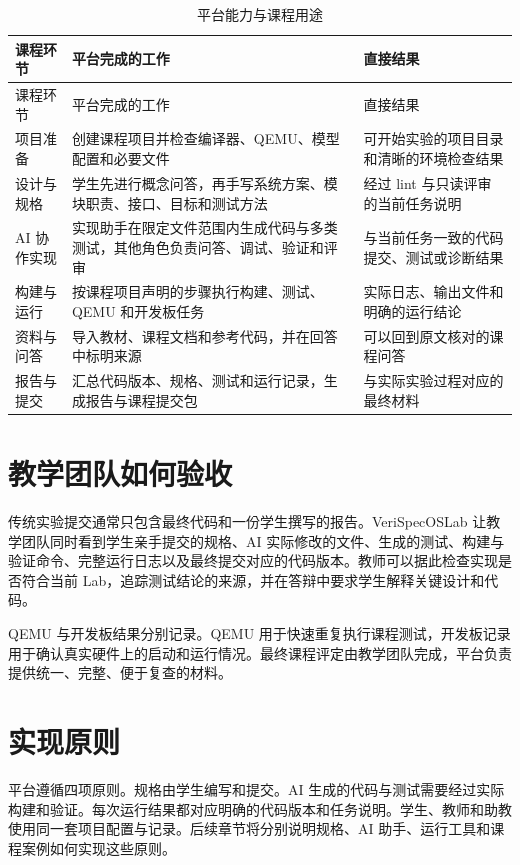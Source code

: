 \begin{longtable}{@{}p{2.6cm}p{6.1cm}p{5.8cm}@{}}
  \caption{平台能力与课程用途}\\
  \toprule
  课程环节 & 平台完成的工作 & 直接结果 \\
  \midrule
  \endfirsthead
  \toprule
  课程环节 & 平台完成的工作 & 直接结果 \\
  \midrule
  \endhead
  项目准备 & 创建课程项目并检查编译器、QEMU、模型配置和必要文件 & 可开始实验的项目目录和清晰的环境检查结果 \\
  设计与规格 & 学生先进行概念问答，再手写系统方案、模块职责、接口、目标和测试方法 & 经过 lint 与只读评审的当前任务说明 \\
  AI 协作实现 & 实现助手在限定文件范围内生成代码与多类测试，其他角色负责问答、调试、验证和评审 & 与当前任务一致的代码提交、测试或诊断结果 \\
  构建与运行 & 按课程项目声明的步骤执行构建、测试、QEMU 和开发板任务 & 实际日志、输出文件和明确的运行结论 \\
  资料与问答 & 导入教材、课程文档和参考代码，并在回答中标明来源 & 可以回到原文核对的课程问答 \\
  报告与提交 & 汇总代码版本、规格、测试和运行记录，生成报告与课程提交包 & 与实际实验过程对应的最终材料 \\
  \bottomrule
\end{longtable}

\section{教学团队如何验收}

传统实验提交通常只包含最终代码和一份学生撰写的报告。VeriSpecOSLab 让教学团队同时看到学生亲手提交的规格、AI 实际修改的文件、生成的测试、构建与验证命令、完整运行日志以及最终提交对应的代码版本。教师可以据此检查实现是否符合当前 Lab，追踪测试结论的来源，并在答辩中要求学生解释关键设计和代码。

QEMU 与开发板结果分别记录。QEMU 用于快速重复执行课程测试，开发板记录用于确认真实硬件上的启动和运行情况。最终课程评定由教学团队完成，平台负责提供统一、完整、便于复查的材料。

\section{实现原则}

平台遵循四项原则。规格由学生编写和提交。AI 生成的代码与测试需要经过实际构建和验证。每次运行结果都对应明确的代码版本和任务说明。学生、教师和助教使用同一套项目配置与记录。后续章节将分别说明规格、AI 助手、运行工具和课程案例如何实现这些原则。
